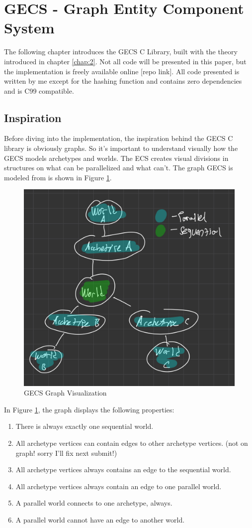 \section{GECS - Graph Entity Component System}
\label{chap:3}

The following chapter introduces the GECS C Library, built with the theory introduced in chapter \ref{chap:2}. Not all code will be presented in this paper, but the implementation is freely available online [repo link]. All code presented is written by me except for the hashing function and contains zero dependencies and is C99 compatible.

\subsection{Inspiration}
Before diving into the implementation, the inspiration behind the GECS C library is obviously graphs. So it's important to understand visually how the GECS models archetypes and worlds. The ECS creates visual divisions in structures on what can be parallelized and what can't. The graph GECS is modeled from is shown in Figure \ref{fig:gecs_graph}.
 
\begin{figure}[H]
    \centering
    \includegraphics[width=0.5\linewidth]{resources/gecs_graph.png}
    \caption{GECS Graph Visualization}
    \label{fig:gecs_graph}
\end{figure}

In Figure \ref{fig:gecs_graph}, the graph displays the following properties:
\begin{enumerate}
    \item There is always exactly one sequential world.
    \item All archetype vertices can contain edges to other archetype vertices. (not on graph! sorry I'll fix next submit!)
    \item All archetype vertices always contains an edge to the sequential world.
    \item All archetype vertices always contain an edge to one parallel world.
    \item A parallel world connects to one archetype, always.
    \item A parallel world cannot have an edge to another world.
\end{enumerate}

